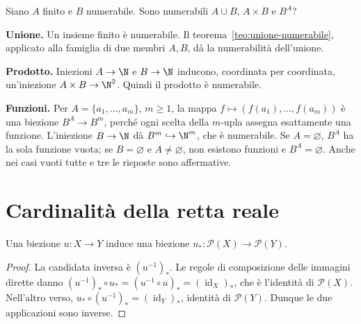 \begin{esercizio}
Siano $A$ finito e $B$ numerabile. Sono numerabili $A\cup B$, $A\times B$ e $B^A$?
\end{esercizio}
\begin{svolgimento}
\textbf{Unione.} Un insieme finito è numerabile. Il teorema~\ref{teo:unione-numerabile}, applicato alla famiglia di due membri $A,B$, dà la numerabilità dell'unione.

\textbf{Prodotto.} Iniezioni $A\to\N$ e $B\to\N$ inducono, coordinata per coordinata, un'iniezione $A\times B\to\N^2$. Quindi il prodotto è numerabile.

\textbf{Funzioni.} Per $A=\{a_1,\ldots,a_m\}$, $m\ge1$, la mappa $f\mapsto(f(a_1),\ldots,f(a_m))$ è una biezione $B^A\to B^m$, perché ogni scelta della $m$-upla assegna esattamente una funzione. L'iniezione $B\to\N$ dà $B^m\hookrightarrow\N^m$, che è numerabile. Se $A=\varnothing$, $B^A$ ha la sola funzione vuota; se $B=\varnothing$ e $A\ne\varnothing$, non esistono funzioni e $B^A=\varnothing$. Anche nei casi vuoti tutte e tre le risposte sono affermative.
\end{svolgimento}

\section{Cardinalità della retta reale}
\begin{proposizione}
Una biezione $u:X\to Y$ induce una biezione $u_*:\mathcal P(X)\to\mathcal P(Y)$.
\end{proposizione}
\begin{proof}
La candidata inversa è $(u^{-1})_*$. Le regole di composizione delle immagini dirette danno $(u^{-1})_*\circ u_*=(u^{-1}\circ u)_*=(\operatorname{id}_X)_*$, che è l'identità di $\mathcal P(X)$. Nell'altro verso, $u_*\circ(u^{-1})_*=(\operatorname{id}_Y)_*$, identità di $\mathcal P(Y)$. Dunque le due applicazioni sono inverse.
\end{proof}

